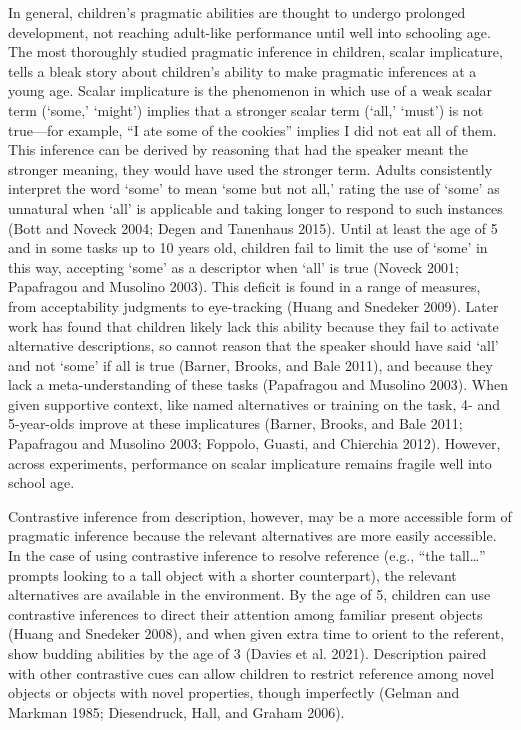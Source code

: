 \documentclass{ucetd}
\begin{document}
In general, children's pragmatic abilities are thought to undergo
prolonged development, not reaching adult-like performance until well
into schooling age. The most thoroughly studied pragmatic inference in
children, scalar implicature, tells a bleak story about children's
ability to make pragmatic inferences at a young age. Scalar implicature
is the phenomenon in which use of a weak scalar term (`some,' `might')
implies that a stronger scalar term (`all,' `must') is not true---for
example, ``I ate some of the cookies'' implies I did not eat all of
them. This inference can be derived by reasoning that had the speaker
meant the stronger meaning, they would have used the stronger term.
Adults consistently interpret the word `some' to mean `some but not
all,' rating the use of `some' as unnatural when `all' is applicable and
taking longer to respond to such instances (Bott and Noveck 2004; Degen
and Tanenhaus 2015). Until at least the age of 5 and in some tasks up to
10 years old, children fail to limit the use of `some' in this way,
accepting `some' as a descriptor when `all' is true (Noveck 2001;
Papafragou and Musolino 2003). This deficit is found in a range of
measures, from acceptability judgments to eye-tracking (Huang and
Snedeker 2009). Later work has found that children likely lack this
ability because they fail to activate alternative descriptions, so
cannot reason that the speaker should have said `all' and not `some' if
all is true (Barner, Brooks, and Bale 2011), and because they lack a
meta-understanding of these tasks (Papafragou and Musolino 2003). When
given supportive context, like named alternatives or training on the
task, 4- and 5-year-olds improve at these implicatures (Barner, Brooks,
and Bale 2011; Papafragou and Musolino 2003; Foppolo, Guasti, and
Chierchia 2012). However, across experiments, performance on scalar
implicature remains fragile well into school age.

Contrastive inference from description, however, may be a more
accessible form of pragmatic inference because the relevant alternatives
are more easily accessible. In the case of using contrastive inference
to resolve reference (e.g., ``the tall\ldots{}'' prompts looking to a
tall object with a shorter counterpart), the relevant alternatives are
available in the environment. By the age of 5, children can use
contrastive inferences to direct their attention among familiar present
objects (Huang and Snedeker 2008), and when given extra time to orient
to the referent, show budding abilities by the age of 3 (Davies et al.
2021). Description paired with other contrastive cues can allow children
to restrict reference among novel objects or objects with novel
properties, though imperfectly (Gelman and Markman 1985; Diesendruck,
Hall, and Graham 2006).
\end{document}
